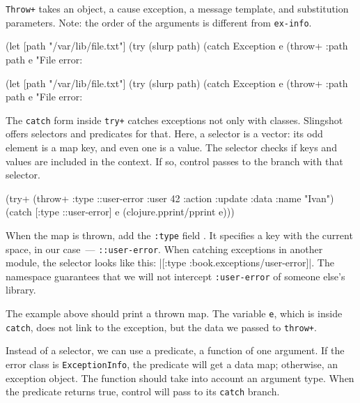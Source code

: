 \fi

\verb|Throw+| takes an object, a cause exception, a message template, and substitution parameters. Note: the order of the arguments is different from \verb|ex-info|.

\ifx\DEVICETYPE\MOBILE

\begin{clojure}
(let [path "/var/lib/file.txt"]
  (try
    (slurp path)
    (catch Exception e
      (throw+ {:path path} e
      "File error: %
\end{clojure}

\else

\begin{clojure}
(let [path "/var/lib/file.txt"]
  (try
    (slurp path)
    (catch Exception e
      (throw+ {:path path} e "File error: %
\end{clojure}

\fi


The \verb|catch| form inside \verb|try+| catches exceptions not only with classes. Slingshot offers selectors and predicates for that. Here, a selector is a vector: its odd element is a map key, and even one is a value. The selector checks if keys and values are included in the context. If so, control passes to the branch with that selector.

\begin{clojure/lines}
(try+
 (throw+ {:type ::user-error
          :user 42
          :action :update
          :data {:name "Ivan"}})
 (catch [:type ::user-error] e
   (clojure.pprint/pprint e)))
\end{clojure/lines}

When the map is thrown, add the \verb|:type| field . It specifies a key with the current space, in our case~--- \verb|::user-error|.
When catching exceptions in another module, the selector looks like this: \spverb|[:type :book.exceptions/user-error]|. The namespace guarantees that we will not intercept \texttt{:user\--error} of someone else's library.

The example above should print a thrown map. The variable \verb|e|, which is inside \verb|catch|, does not link to the exception, but the data we passed to \verb|throw+|.

Instead of a selector, we can use a predicate, a function of one argument. If the error class is \verb|ExceptionInfo|, the predicate will get a data map; otherwise, an exception object. The function should take into account an argument type. When the predicate returns true, control will pass to its \verb|catch| branch.

